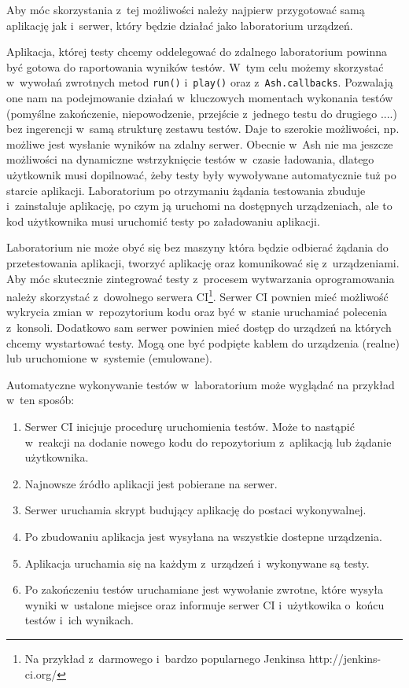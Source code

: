 \documentclass[brudnopis]{xmgr}
\begin{document}
Aby móc skorzystania z~tej możliwości należy najpierw przygotować samą aplikację jak i~serwer, który będzie działać jako laboratorium urządzeń. 

Aplikacja, której testy chcemy oddelegować do zdalnego laboratorium powinna być gotowa do raportowania wyników testów. W~tym celu możemy skorzystać w~wywołań zwrotnych metod \texttt{run()} i~\texttt{play()} oraz z~\texttt{Ash.callbacks}. Pozwalają one nam na podejmowanie działań w~kluczowych momentach wykonania testów (pomyślne zakończenie, niepowodzenie, przejście z~jednego testu do drugiego ....) bez ingerencji w~samą strukturę zestawu testów. Daje to szerokie możliwości, np. możliwe jest wysłanie wyników na zdalny serwer. Obecnie w~Ash nie ma jeszcze możliwości na dynamiczne wstrzyknięcie testów w~czasie ładowania, dlatego użytkownik musi dopilnować, żeby testy były wywoływane automatycznie tuż po starcie aplikacji. Laboratorium po otrzymaniu żądania testowania zbuduje i~zainstaluje aplikację, po czym ją uruchomi na dostępnych urządzeniach, ale to kod użytkownika musi uruchomić testy po załadowaniu aplikacji.

Laboratorium nie może obyć się bez maszyny która będzie odbierać żądania do przetestowania aplikacji, tworzyć aplikację oraz komunikować się z~urządzeniami. Aby móc skutecznie zintegrować testy z~procesem wytwarzania oprogramowania należy skorzystać z~dowolnego serwera CI\footnote{ Na przykład z~darmowego i~bardzo popularnego Jenkinsa http://jenkins-ci.org/}. Serwer CI pownien mieć możliwość wykrycia zmian w~repozytorium kodu oraz być w~stanie uruchamiać polecenia z~konsoli. Dodatkowo sam serwer powinien mieć dostęp do urządzeń na których chcemy wystartować testy. Mogą one być podpięte kablem do urządzenia (realne) lub uruchomione w~systemie (emulowane). 

Automatyczne wykonywanie testów w~laboratorium może wyglądać na przykład w~ten sposób:

\begin{enumerate}
  \item Serwer CI inicjuje procedurę uruchomienia testów. Może to nastąpić w~reakcji na dodanie nowego kodu do repozytorium z~aplikacją lub żądanie użytkownika.
  \item Najnowsze źródło aplikacji jest pobierane na serwer.
  \item Serwer uruchamia skrypt budujący aplikację do postaci wykonywalnej.
  \item Po zbudowaniu aplikacja jest wysyłana na wszystkie dostepne urządzenia.
  \item Aplikacja uruchamia się na każdym z~urządzeń i~wykonywane są testy.
  \item Po zakończeniu testów uruchamiane jest wywołanie zwrotne, które wysyła wyniki w~ustalone miejsce oraz informuje serwer CI i~użytkowika o~końcu testów i~ich wynikach.
\end{enumerate}
\end{document}
